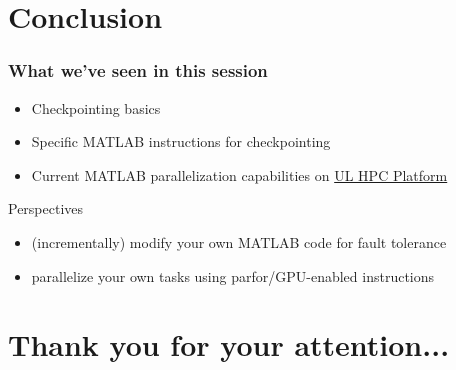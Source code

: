 \documentclass{beamer}
\newcommand{\ULHPC}{\href{http://hpc.uni.lu}{UL HPC Platform}\xspace}
\begin{document}
\section{Conclusion}
\begin{frame}
  \frametitle{What we've seen in this session}
   
    \begin{itemize}
      \item Checkpointing basics
      \item Specific MATLAB instructions for checkpointing
      \item Current MATLAB parallelization capabilities on \ULHPC
    \end{itemize}
 
     \begin{block}{Perspectives}
       \begin{itemize}
         \item (incrementally) modify your own MATLAB code for fault tolerance
         \item parallelize your own tasks using parfor/GPU-enabled instructions
       \end{itemize}
     \end{block}

\end{frame}


\section*{Thank you for your attention...}

\setcounter{finalframe}{\value{framenumber}}


\setcounter{framenumber}{\value{finalframe}}
\end{document}
